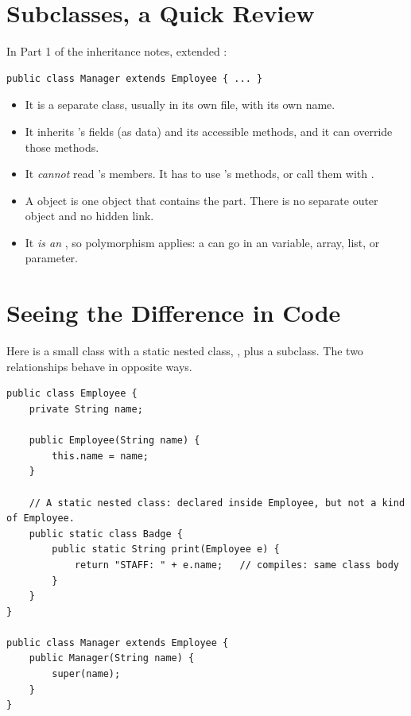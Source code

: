 \documentclass[11pt]{article}
\begin{document}
\section{Subclasses, a Quick Review}

In Part 1 of the inheritance notes,  extended :

\begin{lstlisting}
public class Manager extends Employee { ... }
\end{lstlisting}

\begin{itemize}[leftmargin=1.4em]
  \item It is a separate class, usually in its own file, with its own name.
  \item It inherits 's fields (as data) and its accessible methods, and it can
        override those methods.
  \item It \emph{cannot} read 's  members. It has to use
        's methods, or call them with .
  \item A  object is one object that contains the  part. There is no
        separate outer object and no hidden link.
  \item It \emph{is an} , so polymorphism applies: a  can go in an
         variable, array, list, or parameter.
\end{itemize}

\section{Seeing the Difference in Code}

Here is a small  class with a static nested class, , plus a
 subclass. The two relationships behave in opposite ways.

\begin{lstlisting}
public class Employee {
    private String name;

    public Employee(String name) {
        this.name = name;
    }

    // A static nested class: declared inside Employee, but not a kind of Employee.
    public static class Badge {
        public static String print(Employee e) {
            return "STAFF: " + e.name;   // compiles: same class body
        }
    }
}

public class Manager extends Employee {
    public Manager(String name) {
        super(name);
    }
}
\end{lstlisting}
\end{document}
